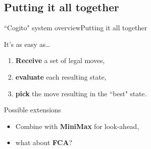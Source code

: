 \subsection{Putting it all together}
\begin{frame}{``Cogito" system overview}{Putting it all together}

\begin{block}{It's as easy as\dots}
\begin{enumerate}
\item \textbf{Receive} a set of legal moves,
\item \textbf{evaluate} each resulting state,
\item \textbf{pick} the move resulting in the ``best" state.
\end{enumerate}
\end{block}

\begin{block}{Possible extensions}
\begin{itemize}
\item Combine with \textbf{MiniMax} for look-ahead,
\item what about \textbf{FCA}?
\end{itemize}
\end{block}

\end{frame}
